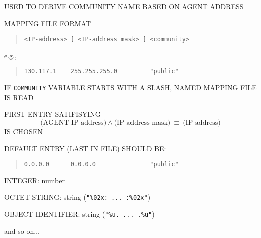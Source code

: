 \begin{bwslide}

\begin{nrtc}
\item	USED TO DERIVE COMMUNITY NAME BASED ON AGENT ADDRESS

\item	MAPPING FILE FORMAT
\begin{quote}\small\begin{verbatim}
<IP-address> [ <IP-address mask> ] <community>
\end{verbatim}\end{quote}
e.g.,
\begin{quote}\small\begin{verbatim}
130.117.1    255.255.255.0         "public"
\end{verbatim}\end{quote}

\item	IF \verb"COMMUNITY" VARIABLE STARTS WITH A SLASH,
	NAMED MAPPING FILE IS READ

\item	FIRST ENTRY SATIFISYING
$$\mbox{(AGENT IP-address)} \land \mbox{(IP-address mask)}\ \equiv\ 
\mbox{(IP-address)}$$
IS CHOSEN

\item	DEFAULT ENTRY (LAST IN FILE) SHOULD BE:
\begin{quote}\small\begin{verbatim}
0.0.0.0      0.0.0.0               "public"
\end{verbatim}\end{quote}
\end{nrtc}
\end{bwslide}


\begin{bwslide}

\begin{nrtc}
\item	INTEGER: number

\item	OCTET STRING: string (\verb|"%02x: ... :%02x"|)

\item	OBJECT IDENTIFIER: string (\verb|"%u. ... .%u"|)

\item	and so on$\ldots$
\end{nrtc}
\end{bwslide}


